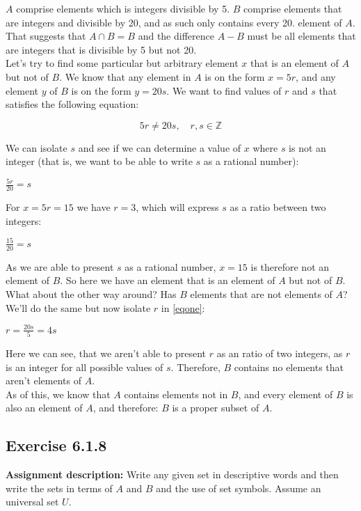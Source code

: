 \documentclass{report}
\newcommand{\cent}[1]{\begin{center}#1\end{center}}
\newcommand{\mat}[2]{\begin{equation} \label{#2}#1\end{equation}}
\newcommand{\doubleZ}{\mathbb{Z}}
\newcommand{\In}{\! \in \!}
\newcommand{\AssignmentDescription}{\textbf{Assignment description: }}
\newcommand{\QED}{\boxed{}}
\newcommand{\Exercise}[1]{\subsection{Exercise #1}}
\begin{document}
	$A$ comprise elements which is integers divisible by 5. $B$ comprise elements that are integers and  divisible by 20, and as such only contains every 20. element of $A$. That suggests that  $A \cap B = B$ and the difference $A - B$ must be all elements that are integers that is divisible by 5 but not 20.\\
	
	Let's try to find some particular but arbitrary element $x$ that is an element of $A$ but not of $B$. We know that any element in $A$ is on the form $x = 5r$, and any element $y$ of $B$ is on the form $y = 20s $. We want to find values of $r$ and $s$ that satisfies the following equation:
	
	\mat{5r\neq20s, \quad r,s \In \doubleZ}{eqone}
	
	We can isolate $s$ and see if we can determine a value of $x$ where $s$ is not an integer (that is, we want to be able to write $s$ as a rational number):
	
	\cent{$\frac{5r}{20} = s$}
	
	For $x = 5r=15$ we have $r=3$, which will express $s$ as a ratio between two integers:
	
	\cent{$\frac{15}{20} = s$}
	
	As we are able to present $s$ as a rational number, $x=15$ is therefore not an element of $B$. So here we have an element that is an element of $A$ but not of $B$. What about the other way around? Has $B$ elements that are not elements of $A$? We'll do the same but now isolate $r$ in \eqref{eqone}:
	
	\cent{$r = \frac{20s}{5} = 4s $}
	
	Here we can see, that we aren't able to present $r$ as an ratio of two integers, as $r$ is an integer for all possible values of $s$. Therefore, $B$ contains no elements that aren't elements of $A$.\\
	
	As of this, we know that $A$ contains elements not in $B$, and every element of $B$ is also an element of $A$, and therefore: $B$ is a proper subset of $A$.\\
	\QED
	
	\Exercise{6.1.8}
	
	\AssignmentDescription
	Write any given set in descriptive words and then write the sets in terms of $A$ and $B$ and the use of set symbols. Assume an universal set $U$.\\
	
\end{document}
